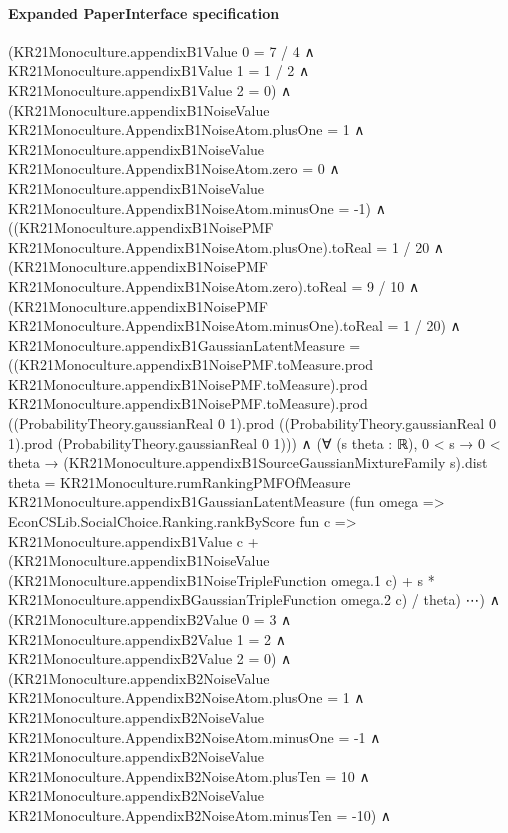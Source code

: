 \documentclass[10pt]{article}
\begin{document}
\paragraph{Expanded PaperInterface specification}
\begin{ReviewVerbatim}
(KR21Monoculture.appendixB1Value 0 = 7 / 4 ∧
    KR21Monoculture.appendixB1Value 1 = 1 / 2 ∧ KR21Monoculture.appendixB1Value 2 = 0) ∧
  (KR21Monoculture.appendixB1NoiseValue KR21Monoculture.AppendixB1NoiseAtom.plusOne = 1 ∧
      KR21Monoculture.appendixB1NoiseValue KR21Monoculture.AppendixB1NoiseAtom.zero = 0 ∧
        KR21Monoculture.appendixB1NoiseValue KR21Monoculture.AppendixB1NoiseAtom.minusOne = -1) ∧
    ((KR21Monoculture.appendixB1NoisePMF KR21Monoculture.AppendixB1NoiseAtom.plusOne).toReal = 1 / 20 ∧
        (KR21Monoculture.appendixB1NoisePMF KR21Monoculture.AppendixB1NoiseAtom.zero).toReal = 9 / 10 ∧
          (KR21Monoculture.appendixB1NoisePMF KR21Monoculture.AppendixB1NoiseAtom.minusOne).toReal = 1 / 20) ∧
      KR21Monoculture.appendixB1GaussianLatentMeasure =
          ((KR21Monoculture.appendixB1NoisePMF.toMeasure.prod KR21Monoculture.appendixB1NoisePMF.toMeasure).prod
                KR21Monoculture.appendixB1NoisePMF.toMeasure).prod
            ((ProbabilityTheory.gaussianReal 0 1).prod
              ((ProbabilityTheory.gaussianReal 0 1).prod (ProbabilityTheory.gaussianReal 0 1))) ∧
        (∀ (s theta : ℝ),
            0 < s →
              0 < theta →
                (KR21Monoculture.appendixB1SourceGaussianMixtureFamily s).dist theta =
                  KR21Monoculture.rumRankingPMFOfMeasure KR21Monoculture.appendixB1GaussianLatentMeasure
                    (fun omega =>
                      EconCSLib.SocialChoice.Ranking.rankByScore fun c =>
                        KR21Monoculture.appendixB1Value c +
                          (KR21Monoculture.appendixB1NoiseValue
                                (KR21Monoculture.appendixB1NoiseTripleFunction omega.1 c) +
                              s * KR21Monoculture.appendixBGaussianTripleFunction omega.2 c) /
                            theta)
                    ⋯) ∧
          (KR21Monoculture.appendixB2Value 0 = 3 ∧
              KR21Monoculture.appendixB2Value 1 = 2 ∧ KR21Monoculture.appendixB2Value 2 = 0) ∧
            (KR21Monoculture.appendixB2NoiseValue KR21Monoculture.AppendixB2NoiseAtom.plusOne = 1 ∧
                KR21Monoculture.appendixB2NoiseValue KR21Monoculture.AppendixB2NoiseAtom.minusOne = -1 ∧
                  KR21Monoculture.appendixB2NoiseValue KR21Monoculture.AppendixB2NoiseAtom.plusTen = 10 ∧
                    KR21Monoculture.appendixB2NoiseValue KR21Monoculture.AppendixB2NoiseAtom.minusTen = -10) ∧

\end{ReviewVerbatim}
\end{document}
